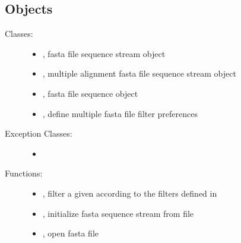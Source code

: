 \documentclass[letterpaper,10pt,english]{sphinxmanual}
\begin{document}
\subsection{Objects}
\label{fasta:objects}\begin{description}
\item[{Classes:}] \leavevmode\begin{itemize}
\item {} 
{\hyperref[fasta:libPoMo.fasta.FaStream]{}}, fasta file sequence stream object

\item {} 
{\hyperref[fasta:libPoMo.fasta.MFaStream]{}}, multiple alignment fasta file sequence stream object

\item {} 
{\hyperref[fasta:libPoMo.fasta.FaSeq]{}}, fasta file sequence object

\item {} 
{\hyperref[fasta:libPoMo.fasta.MFaStrFilterProps]{}}, define multiple fasta file filter preferences

\end{itemize}

\item[{Exception Classes:}] \leavevmode\begin{itemize}
\item {} 
{\hyperref[fasta:libPoMo.fasta.NotAFastaFileError]{}}

\end{itemize}

\item[{Functions:}] \leavevmode\begin{itemize}
\item {} 
{\hyperref[fasta:libPoMo.fasta.filter_mfa_str]{}}, filter a given {\hyperref[fasta:libPoMo.fasta.MFaStream]{}}
according to the filters defined in {\hyperref[fasta:libPoMo.fasta.MFaStrFilterProps]{}}

\item {} 
{\hyperref[fasta:libPoMo.fasta.init_seq]{}}, initialize fasta sequence stream from file

\item {} 
{\hyperref[fasta:libPoMo.fasta.open_seq]{}}, open fasta file


\end{itemize}
\end{description}
\end{document}

